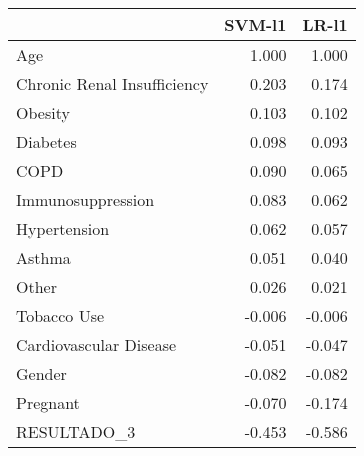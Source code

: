 \begin{tabular}{lrr}
\toprule
{} &  SVM-l1 &  LR-l1 \\
\midrule
Age                         &   1.000 &  1.000 \\
Chronic Renal Insufficiency &   0.203 &  0.174 \\
Obesity                     &   0.103 &  0.102 \\
Diabetes                    &   0.098 &  0.093 \\
COPD                        &   0.090 &  0.065 \\
Immunosuppression           &   0.083 &  0.062 \\
Hypertension                &   0.062 &  0.057 \\
Asthma                      &   0.051 &  0.040 \\
Other                       &   0.026 &  0.021 \\
Tobacco Use                 &  -0.006 & -0.006 \\
Cardiovascular Disease      &  -0.051 & -0.047 \\
Gender                      &  -0.082 & -0.082 \\
Pregnant                    &  -0.070 & -0.174 \\
RESULTADO\_3                 &  -0.453 & -0.586 \\
\bottomrule
\end{tabular}
